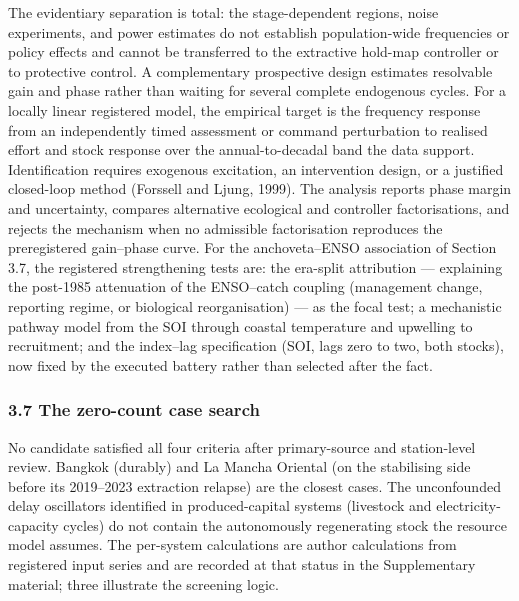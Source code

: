 \documentclass[11pt]{article}
\begin{document}
The evidentiary separation is total: the stage-dependent regions, noise
experiments, and power estimates do not establish population-wide
frequencies or policy effects and cannot be transferred to the
extractive hold-map controller or to protective control. A complementary
prospective design estimates resolvable gain and phase rather than
waiting for several complete endogenous cycles. For a locally linear
registered model, the empirical target is the frequency response from an
independently timed assessment or command perturbation to realised
effort and stock response over the annual-to-decadal band the data
support. Identification requires exogenous excitation, an intervention
design, or a justified closed-loop method (Forssell and Ljung, 1999).
The analysis reports phase margin and uncertainty, compares alternative
ecological and controller factorisations, and rejects the mechanism when
no admissible factorisation reproduces the preregistered gain--phase
curve. For the anchoveta--ENSO association of Section 3.7, the
registered strengthening tests are: the era-split attribution ---
explaining the post-1985 attenuation of the ENSO--catch coupling
(management change, reporting regime, or biological reorganisation) ---
as the focal test; a mechanistic pathway model from the SOI through
coastal temperature and upwelling to recruitment; and the index--lag
specification (SOI, lags zero to two, both stocks), now fixed by the
executed battery rather than selected after the fact.

\subsubsection{3.7 The zero-count case
search}\label{the-zero-count-case-search}

No candidate satisfied all four criteria after primary-source and
station-level review. Bangkok (durably) and La Mancha Oriental (on the
stabilising side before its 2019--2023 extraction relapse) are the
closest cases. The unconfounded delay oscillators identified in
produced-capital systems (livestock and electricity-capacity cycles) do
not contain the autonomously regenerating stock the resource model
assumes. The per-system calculations are author calculations from
registered input series and are recorded at that status in the
Supplementary material; three illustrate the screening logic.
\end{document}
